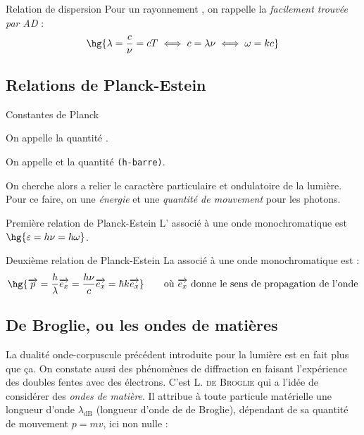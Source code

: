 \documentclass[a4paper,french,bookmarks]{article}
\begin{document}
\begin{property}{Relation de dispersion}{}
    Pour un rayonnement , on rappelle la  \textit{facilement trouvée par AD} :
    \[ \hg{ \lambda = \dfrac{c}{\nu} = cT \iff c = \lambda \nu \iff \omega = k c } \]
\end{property}

\subsection{Relations de Planck-Estein}

\begin{definition}{Constantes de Planck}{}
    \begin{enumerate}
        \ithand On appelle  la quantité .
        
        \ithand On appelle et  la quantité  \texttt{(h-barre)}.
    \end{enumerate}
\end{definition}

On cherche alors a relier le caractère particulaire et ondulatoire de la lumière. Pour ce faire, on  une \textit{énergie} et une \textit{quantité de mouvement} pour les photons.

\begin{definition}{Première relation de Planck-Estein}{}
    L' associé à une onde monochromatique est $\hg{\epsilon = h\nu = \hbar\omega}$.
\end{definition}

\begin{definition}{Deuxième relation de Planck-Estein}{}
    La  associé à une onde monochromatique est :
    \[ \hg{\vec{p} = \dfrac{h}{\lambda}\vec{e_x} = \dfrac{h\nu}{c}\vec{e_x} = \hbar k\vec{e_x}} \qquad\text{où} \ \vec{e_x} \ \text{donne le sens de propagation de l'onde}\]
\end{definition}

\subsection{De Broglie, ou les ondes de matières}

La dualité onde-corpuscule précédent introduite pour la lumière est en fait plus  que ça. On constate aussi des phénomènes de diffraction en faisant l'expérience des doubles fentes avec des électrons. C'est \textsc{L. de Broglie} qui a l'idée de considérer des \textit{\color{main1} ondes de matière}. Il attribue à toute particule matérielle une longueur d'onde $\lambda_\text{dB}$ (longueur d'onde de de Broglie), dépendant de sa quantité de mouvement $p = mv$, ici non nulle :
\end{document}
